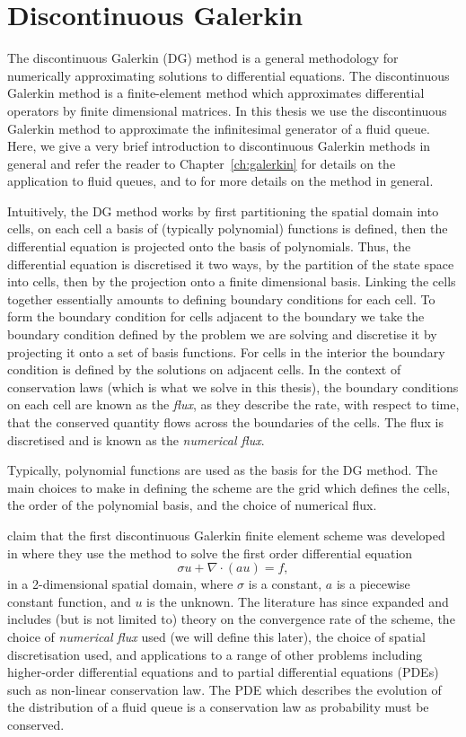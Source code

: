 \section{Discontinuous Galerkin}
The discontinuous Galerkin (DG) method is a general methodology for numerically approximating solutions to differential equations. The discontinuous Galerkin method is a finite-element method which approximates differential operators by finite dimensional matrices. In this thesis we use the discontinuous Galerkin method to approximate the infinitesimal generator of a fluid queue. Here, we give a very brief introduction to discontinuous Galerkin methods in general and refer the reader to Chapter~\ref{ch:galerkin} for details on the application to fluid queues, and to \cite{nodalDGBook} for more details on the method in general. 

Intuitively, the DG method works by first partitioning the spatial domain into cells, on each cell a basis of (typically polynomial) functions is defined, then the differential equation is projected onto the basis of polynomials. Thus, the differential equation is discretised it two ways, by the partition of the state space into cells, then by the projection onto a finite dimensional basis. Linking the cells together essentially amounts to defining boundary conditions for each cell. To form the boundary condition for cells adjacent to the boundary we take the boundary condition defined by the problem we are solving and discretise it by projecting it onto a set of basis functions. For cells in the interior the boundary condition is defined by the solutions on adjacent cells. In the context of conservation laws (which is what we solve in this thesis), the boundary conditions on each cell are known as the \emph{flux}, as they describe the rate, with respect to time, that the conserved quantity flows across the boundaries of the cells. The flux is discretised and is known as the \emph{numerical flux}.

Typically, polynomial functions are used as the basis for the DG method. The main choices to make in defining the scheme are the grid which defines the cells, the order of the polynomial basis, and the choice of numerical flux. 

\cite{nodalDGBook} claim that the first discontinuous Galerkin finite element scheme was developed in \cite{reed1973} where they use the method to solve the first order differential equation
\[\sigma u + \nabla \cdot (a u) = f,\]
in a 2-dimensional spatial domain, where \(\sigma\) is a constant, \(a\) is a piecewise constant function, and \(u\) is the unknown. The literature has since expanded and includes (but is not limited to) theory on the convergence rate of the scheme, the choice of \emph{numerical flux} used (we will define this later), the choice of spatial discretisation used, and applications to a range of other problems including higher-order differential equations and to partial differential equations (PDEs) such as non-linear conservation law. The PDE which describes the evolution of the distribution of a fluid queue is a conservation law as probability must be conserved. 

